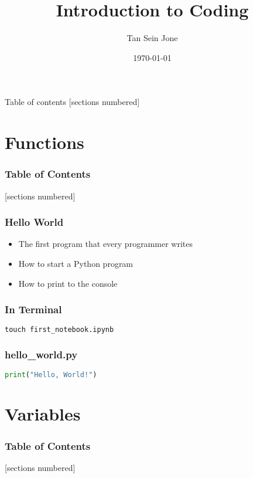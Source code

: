 \documentclass[serif, 9pt, aspectratio=32]{beamer}
\title{Introduction to Coding}
\date{\today}
\author{Tan Sein Jone}
\institute{University of British Columbia}
\begin{document}
\maketitle

\begin{frame}{Table of contents}
    [sections numbered]
    \tableofcontents[hideallsubsections]
\end{frame}

\section{Functions}

\begin{frame}
    \frametitle{Table of Contents}
    [sections numbered]
    \tableofcontents[currentsection]
\end{frame}

\begin{frame}
    \centering
    \frametitle{Hello World}
    \begin{itemize}
        \setlength{\itemsep}{3em}
        \item The first program that every programmer writes
        \item How to start a Python program
        \item How to print to the console
    \end{itemize}
\end{frame}

\begin{frame}[fragile]
    \frametitle{In Terminal}
    \begin{lstlisting}[language=Python]
        touch first_notebook.ipynb
    \end{lstlisting}
\end{frame}

\begin{frame}[fragile]
    \frametitle{hello\_world.py}
    \begin{lstlisting}[language=Python]
        print("Hello, World!")
    \end{lstlisting}
\end{frame}

\section{Variables}

\begin{frame}
    \frametitle{Table of Contents}
    [sections numbered]
    \tableofcontents[currentsection]
\end{frame}
\end{document}
